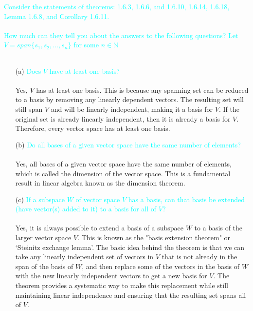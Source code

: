 \documentclass[fontsize=12pt]{scrartcl}
\begin{document}
\noindent
\textcolor{cyan}{Consider the statements of theorems: 1.6.3, 1.6.6, and 1.6.10, 1.6.14, 1.6.18, Lemma 1.6.8, and Corollary 1.6.11.}\\
\\
\textcolor{cyan}{How much can they tell you about the answers to the following questions? Let $V = span\{s_1, s_2, \ldots , s_n\}$ for some $n \in \mathbb{N}$} \\
\\
\begin{itemize}
    \item[(a)] \textcolor{cyan}{Does $V$ have at least one basis?} \\
    \\ Yes, $V$ has at least one basis. This is because any spanning set can be reduced to a basis by removing any linearly dependent vectors. The resulting set will still span $V$ and will be linearly independent, making it a basis for $V$. If the original set is already linearly independent, then it is already a basis for $V$. Therefore, every vector space has at least one basis.
    \\
    \item[(b)] \textcolor{cyan}{Do all bases of a given vector space have the same number of elements?}\\
    \\ Yes, all bases of a given vector space have the same number of elements, which is called the dimension of the vector space. This is a fundamental result in linear algebra known as the dimension theorem.
    \\
    \item[(c)] \textcolor{cyan}{If a subspace $W$ of vector space $V$ has a basis, can that basis be extended (have vector(s) added to it) to a basis for all of $V$?}\\
    \\ Yes, it is always possible to extend a basis of a subspace $W$ to a basis of the larger vector space $V$. This is known as the "basis extension theorem" or `Steinitz exchange lemma'. The basic idea behind the theorem is that we can take any linearly independent set of vectors in $V$ that is not already in the span of the basis of $W$, and then replace some of the vectors in the basis of $W$ with the new linearly independent vectors to get a new basis for $V$. The theorem provides a systematic way to make this replacement while still maintaining linear independence and ensuring that the resulting set spans all of $V$.
    \\

\end{itemize}
\end{document}
